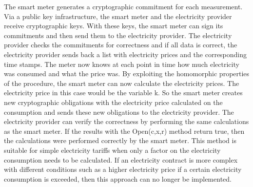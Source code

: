 The smart meter generates a cryptographic commitment for each measurement. Via a public key infrastructure, the smart meter and the electricity provider receive cryptographic keys. With these keys, the smart meter can sign its commitments and then send them to the electricity provider. The electricity provider checks the commitments for correctness and if all data is correct, the electricity provider sends back a list with electricity prices and the corresponding time stamps. The meter now knows at each point in time how much electricity was consumed and what the price was. By exploiting the homomorphic properties of the procedure, the smart meter can now calculate the electricity prices. The electricity price in this case would be the variable k. So the smart meter creates new cryptographic obligations with the electricity price calculated on the consumption and sends these new obligations to the electricity provider. The electricity provider can verify the correctness by performing the same calculations as the smart meter. If the results with the Open(c,x,r) method return true, then the calculations were performed correctly by the smart meter.
This method is suitable for simple electricity tariffs when only a factor on the electricity consumption needs to be calculated. If an electricity contract is more complex with different conditions such as a higher electricity price if a certain electricity consumption is exceeded, then this approach can no longer be implemented.
